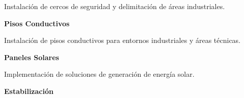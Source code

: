 \documentclass[a4paper,11pt]{article}
\begin{document}
{{\begin{center}
\begin{minipage}{18cm}
\begin{minipage}[t]{5.5cm}
{{                    \vspace{0.3cm}
                    
                    {\small Instalación de cercos de seguridad y delimitación de áreas industriales.}
                    \vspace{0.5cm}
                }}
            \end{minipage}
            \hfill
            \begin{minipage}[t]{5.5cm}
                \colorbox{blancoJM}{\parbox[t][4.5cm][t]{5.3cm}{
                    \vspace{0.5cm}
                    \centering
                    {\color{naranjaJM}\faIndustry\quad}{\Large\color{azulJM}\textbf{Pisos Conductivos}}
                    
                    \vspace{0.3cm}
                    
                    {\small Instalación de pisos conductivos para entornos industriales y áreas técnicas.}
                    \vspace{0.5cm}
                }}
            \end{minipage}
            
            \vspace{0.8cm}
            
            \begin{minipage}[t]{5.5cm}
                \colorbox{blancoJM}{\parbox[t][4.5cm][t]{5.3cm}{
                    \vspace{0.5cm}
                    \centering
                    {\color{naranjaJM}\faSolarPanel\quad}{\Large\color{azulJM}\textbf{Paneles Solares}}
                    
                    \vspace{0.3cm}
                    
                    {\small Implementación de soluciones de generación de energía solar.}
                    \vspace{0.5cm}
                }}
            \end{minipage}
            \hfill
            \begin{minipage}[t]{5.5cm}
                \colorbox{blancoJM}{\parbox[t][4.5cm][t]{5.3cm}{
                    \vspace{0.5cm}
                    \centering
                    {\color{naranjaJM}\faRoad\quad}{\Large\color{azulJM}\textbf{Estabilización}}
                    
}}
\end{minipage}
\end{minipage}
\end{center}}}
\end{document}
